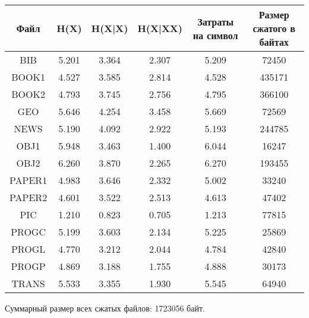 \documentclass[fontsize=13pt]{article}
\begin{document}
\begin{center}
\begin{tabular}{|c|c|c|c|c|c|}
	\hline
	\textbf{Файл} & \textbf{H(X)} & \textbf{H(X|X)} & \textbf{H(X|XX)} & \textbf{Затраты на символ} & \textbf{Размер сжатого в байтах} \\
	\hline
	
	BIB & 5.201 & 3.364 & 2.307 & 5.209 & 72450 \\
	\hline
	
	BOOK1 & 4.527 & 3.585 & 2.814 & 4.528 & 435171 \\
	\hline
	
	BOOK2 & 4.793 & 3.745 & 2.756 & 4.795 & 366100 \\
	\hline
	
	GEO & 5.646 & 4.254 & 3.458 & 5.669 & 72569 \\
	\hline
	
	NEWS & 5.190 & 4.092 & 2.922 & 5.193 & 244785 \\
	\hline
	
	OBJ1 & 5.948 & 3.463 & 1.400 & 6.044 & 16247 \\
	\hline
	
	OBJ2 & 6.260 & 3.870 & 2.265 & 6.270 & 193455 \\
	\hline
	
	PAPER1 & 4.983 & 3.646 & 2.332 & 5.002 & 33240 \\
	\hline
	
	PAPER2 & 4.601 & 3.522 & 2.513 & 4.613 & 47402 \\
	\hline
	
	PIC & 1.210 & 0.823 & 0.705 & 1.213 & 77815 \\
	\hline
	
	PROGC & 5.199 & 3.603 & 2.134 & 5.225 & 25869 \\
	\hline
	
	PROGL & 4.770 & 3.212 & 2.044 & 4.784 & 42840 \\
	\hline
	
	PROGP & 4.869 & 3.188 & 1.755 & 4.888 & 30173 \\
	\hline
	
	TRANS & 5.533 & 3.355 & 1.930 & 5.545 & 64940 \\
	\hline
\end{tabular}
\end{center}

Суммарный размер всех сжатых файлов: 1723056 байт.
\end{document}
